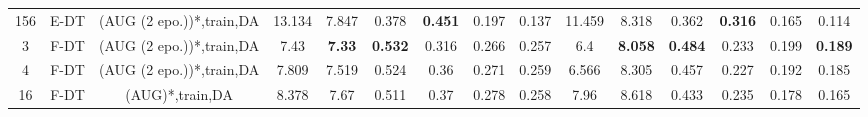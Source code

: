 \begin{table}
\begin{tabular}{@{\hskip3pt}c@{\hskip3pt}c@{\hskip3pt}c@{\hskip3pt}c@{\hskip3pt}c@{\hskip3pt}c@{\hskip3pt}c@{\hskip3pt}c@{\hskip3pt}c@{\hskip3pt}c@{\hskip3pt}c@{\hskip3pt}c@{\hskip3pt}c@{\hskip3pt}c@{\hskip3pt}c}
        156 &           E-DT &  (AUG (2 epo.))*,train,DA &            13.134 &          7.847 &           0.378 &  \textbf{0.451} &           0.197 &           0.137 &              11.459 &           8.318 &           0.362 &  \textbf{0.316} &           0.165 &           0.114 \\
          3 &           F-DT &  (AUG (2 epo.))*,train,DA &              7.43 &  \textbf{7.33} &  \textbf{0.532} &           0.316 &           0.266 &           0.257 &                 6.4 &  \textbf{8.058} &  \textbf{0.484} &           0.233 &           0.199 &  \textbf{0.189} \\
          4 &           F-DT &  (AUG (2 epo.))*,train,DA &             7.809 &          7.519 &           0.524 &            0.36 &           0.271 &           0.259 &               6.566 &           8.305 &           0.457 &           0.227 &           0.192 &           0.185 \\
         16 &           F-DT &           (AUG)*,train,DA &             8.378 &           7.67 &           0.511 &            0.37 &           0.278 &           0.258 &                7.96 &           8.618 &           0.433 &           0.235 &           0.178 &           0.165 \\
\bottomrule
\end{tabular}
\end{table}
